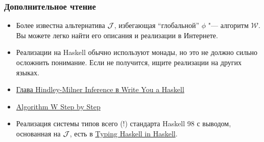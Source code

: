 \documentclass[11pt]{beamer}
\begin{document}
\begin{frame}[fragile]
\frametitle{Дополнительное чтение}
\begin{itemize}
    \item Более известна альтернатива $\mathcal{J}$, избегающая \enquote{глобальной} $\phi$ "--- алгоритм $\mathcal{W}$. Вы можете легко найти его описания и реализации в Интернете.
    \item Реализации на Haskell обычно используют монады, но это не должно сильно осложнить понимание. Если не получится, ищите реализации на других языках.
    \item \href{http://dev.stephendiehl.com/fun/006_hindley_milner.html}{Глава Hindley-Milner Inference в Write You a Haskell}
    \item \href{http://citeseerx.ist.psu.edu/viewdoc/summary?doi=10.1.1.65.7733}{Algorithm W Step by Step}
    \item Реализация системы типов всего (!) стандарта Haskell 98 с выводом, основанная на $\mathcal{J}$, есть в \href{https://gist.github.com/chrisdone/0075a16b32bfd4f62b7b}{Typing Haskell in Haskell}.
\end{itemize}
\end{frame}
\end{document}

